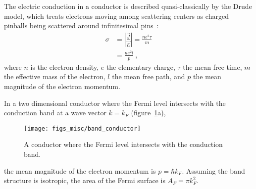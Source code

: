 The electric conduction in a conductor is described quasi-classically by the Drude model, which treats electrons moving among scattering centers as charged pinballs being scattered around infinitesimal pins~\cite{drude1900}:%
\begin{align}%
    \sigma &= \left|\frac{\vec{J}}{\vec{E}}\right| = \frac{ne^2\tau}{m}\nonumber\\
        &= \frac{ne^2l}{p}~,\label{eq:drude}
\end{align}%
where $n$ is the electron density, $e$ the elementary charge, $\tau$ the mean free time, $m$ the effective mass of the electron, $l$ the mean free path, and $p$ the mean magnitude of the electron momentum.

In a two dimensional conductor where the Fermi level intersects with the conduction band at a wave vector $k = k_F$ (figure~\ref{fig:band_conductor}a), %
\begin{figure}[ht]%
    \centering%
    \texttt{[image: figs\_misc/band\_conductor]}%
    \caption[Band structure of an n-type conductor]{\label{fig:band_conductor}A conductor where the Fermi level intersects with the conduction band.}%
\end{figure}%
%
the mean magnitude of the electron momentum is $p = \hbar k_F$. Assuming the band structure is isotropic, the area of the Fermi surface is $A_F = \pi k_F^2$.